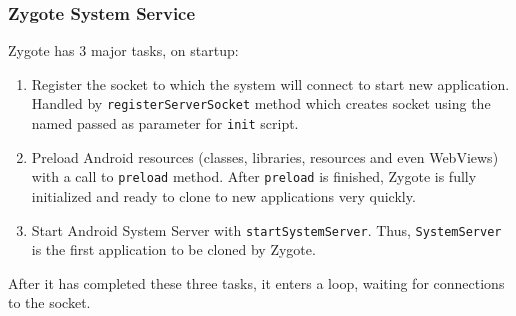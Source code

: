 \subsubsection*{Zygote System Service}

Zygote has 3 major tasks, on startup:
\begin{enumerate}
    \item Register the socket to which the system will connect to start new application. Handled by \texttt{registerServerSocket} method which creates socket using the named passed as parameter for \texttt{init} script.
    \item Preload Android resources (classes, libraries, resources and even WebViews) with a call to \texttt{preload} method. After \texttt{preload} is finished, Zygote is fully initialized and ready to clone to new applications very quickly.
    \item Start Android System Server with \texttt{startSystemServer}. Thus, \texttt{SystemServer} is the first application to be cloned by Zygote.
\end{enumerate}
After it has completed these three tasks, it enters a loop, waiting for connections to the socket.
